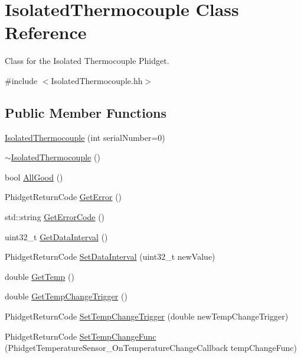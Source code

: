 \hypertarget{classIsolatedThermocouple}{}\section{Isolated\+Thermocouple Class Reference}
\label{classIsolatedThermocouple}


Class for the Isolated Thermocouple Phidget.  




{\ttfamily \#include $<$Isolated\+Thermocouple.\+hh$>$}

\subsection*{Public Member Functions}
\begin{DoxyCompactItemize}
\item 
\hyperlink{classIsolatedThermocouple_aa47500e6b64c5022119f5842fec998ab}{Isolated\+Thermocouple} (int serial\+Number=0)
\item 
\hyperlink{classIsolatedThermocouple_aec83a3f556a27500ab340a87d27dbe4d}{$\sim$\+Isolated\+Thermocouple} ()
\item 
bool \hyperlink{classIsolatedThermocouple_abb71c477ed8dd8fc1275b35a9ac66a63}{All\+Good} ()
\item 
Phidget\+Return\+Code \hyperlink{classIsolatedThermocouple_a3472314d4a3a3ae8ae01c9d46f43e029}{Get\+Error} ()
\item 
std\+::string \hyperlink{classIsolatedThermocouple_a3a0569bb49b7170513d62f784486da28}{Get\+Error\+Code} ()
\item 
uint32\+\_\+t \hyperlink{classIsolatedThermocouple_abda8f7448a0dc141475e81e8a08a5204}{Get\+Data\+Interval} ()
\item 
Phidget\+Return\+Code \hyperlink{classIsolatedThermocouple_a7d4ff9c47960781140634cb8eeac1258}{Set\+Data\+Interval} (uint32\+\_\+t new\+Value)
\item 
double \hyperlink{classIsolatedThermocouple_ad67a32bc965bd7833c8dd484cd8639ef}{Get\+Temp} ()
\item 
double \hyperlink{classIsolatedThermocouple_a5ffb58e143f6e917766de282dcc6a6eb}{Get\+Temp\+Change\+Trigger} ()
\item 
Phidget\+Return\+Code \hyperlink{classIsolatedThermocouple_acd521a981c7bee54599ce4f9b926a1f8}{Set\+Temp\+Change\+Trigger} (double new\+Temp\+Change\+Trigger)
\item 
Phidget\+Return\+Code \hyperlink{classIsolatedThermocouple_a1aad9e7c6c473de87a636bff910283c6}{Set\+Temp\+Change\+Func} (Phidget\+Temperature\+Sensor\+\_\+\+On\+Temperature\+Change\+Callback temp\+Change\+Func)
\end{DoxyCompactItemize}


